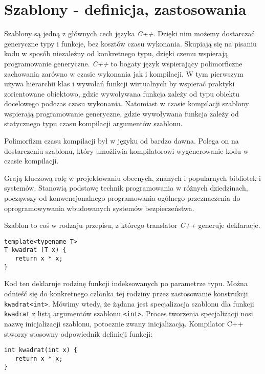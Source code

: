 \documentclass[11pt, a4paper]{article}
\begin{document}
\lstset{language=C++}

\section{Szablony - definicja, zastosowania}
Szablony są jedną z głównych cech języka \emph{C++}. Dzięki nim możemy dostarczać generyczne typy i funkcje, bez kosztów czasu wykonania. Skupiają się na pisaniu kodu w sposób niezależny od konkretnego typu, dzięki czemu wspierają programowanie generyczne. \emph{C++} to bogaty język wspierający polimorficzne zachowania zarówno w czasie wykonania jak i kompilacji. W tym pierwszym używa hierarchii klas i wywołań funkcji wirtualnych by wspierać praktyki zorientowane obiektowo, gdzie wywoływana funkcja zależy od typu obiektu docelowego podczas czasu wykonania. Natomiast w czasie kompilacji szablony wspierają programowanie generyczne, gdzie wywoływana funkcja zależy od statycznego typu czasu kompilacji argumentów szablonu.

Polimorfizm czasu kompilacji był w języku od bardzo dawna. Polega on na dostarczeniu szablonu, który umożliwia kompilatorowi wygenerowanie kodu w czasie kompilacji.

Grają kluczową rolę w projektowaniu obecnych, znanych i popularnych bibliotek i systemów. Stanowią podstawę technik programowania w różnych dziedzinach, począwszy od konwencjonalnego programowania ogólnego przeznaczenia do oprogramowywania wbudowanych 
systemów bezpieczeństwa.

Szablon to coś w rodzaju przepisu, z którego translator \emph{C++} generuje deklaracje.

\begin{lstlisting}[frame=single]
template<typename T>
T kwadrat (T x) {
   return x * x;
}
\end{lstlisting}

Kod ten deklaruje rodzinę funkcji indeksowanych po parametrze typu. Można odnieść się do konkretnego członka tej rodziny przez zastosowanie konstrukcji \verb#kwadrat<int>#. Mówimy wtedy, że żądana jest specjalizacja szablonu dla funkcji \verb#kwadrat# z listą argumentów szablonu \verb#<int>#. Proces tworzenia specjalizacji nosi nazwę inicjalizacji szablonu, potocznie zwany inicjalizacją. Kompilator C++ stworzy stosowny odpowiednik definicji funkcji:

\begin{lstlisting}[frame=single]
int kwadrat(int x) {
   return x * x;
}
\end{lstlisting}
\end{document}
